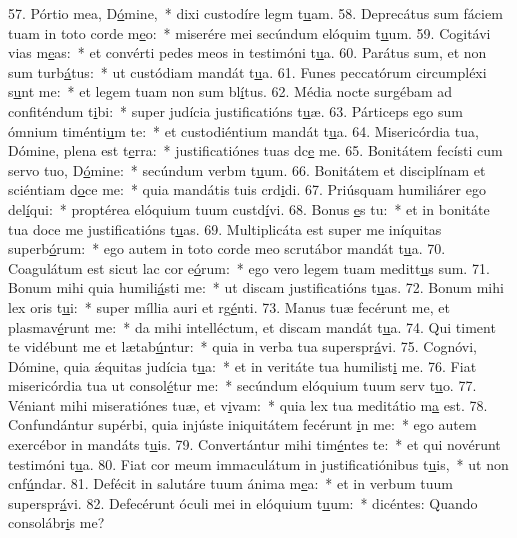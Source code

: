 57. Pórtio mea, D\uline{ó}mine,~* dixi custodíre legm t\uline{u}am.
58. Deprecátus sum fáciem tuam in toto corde m\uline{e}o:~* miserére mei secúndum elóquim t\uline{u}um.
59. Cogitávi vias m\uline{e}as:~* et convérti pedes meos in testimóni t\uline{u}a.
60. Parátus sum, et non sum turb\uline{á}tus:~* ut custódiam mandát t\uline{u}a.
61. Funes peccatórum circumpléxi s\uline{u}nt me:~* et legem tuam non sum bl\uline{í}tus.
62. Média nocte surgébam ad confiténdum t\uline{i}bi:~* super judícia justificatións t\uline{u}æ.
63. Párticeps ego sum ómnium timénti\uline{u}m te:~* et custodiéntium mandát t\uline{u}a.
64. Misericórdia tua, Dómine, plena est t\uline{e}rra:~* justificatiónes tuas dc\uline{e} me.
65. Bonitátem fecísti cum servo tuo, D\uline{ó}mine:~* secúndum verbm t\uline{u}um.
66. Bonitátem et disciplínam et sciéntiam d\uline{o}ce me:~* quia mandátis tuis crd\uline{i}di.
67. Priúsquam humiliárer ego del\uline{í}qui:~* proptérea elóquium tuum custd\uline{í}vi.
68. Bonus \uline{e}s tu:~* et in bonitáte tua doce me justificatións t\uline{u}as.
69. Multiplicáta est super me iníquitas superb\uline{ó}rum:~* ego autem in toto corde meo scrutábor mandát t\uline{u}a.
70. Coagulátum est sicut lac cor e\uline{ó}rum:~* ego vero legem tuam meditt\uline{u}s sum.
71. Bonum mihi quia humili\uline{á}sti me:~* ut discam justificatións t\uline{u}as.
72. Bonum mihi lex oris t\uline{u}i:~* super míllia auri et rg\uline{é}nti.
73. Manus tuæ fecérunt me, et plasmav\uline{é}runt me:~* da mihi intelléctum, et discam mandát t\uline{u}a.
74. Qui timent te vidébunt me et lætab\uline{ú}ntur:~* quia in verba tua superspr\uline{á}vi.
75. Cognóvi, Dómine, quia ǽquitas judícia t\uline{u}a:~* et in veritáte tua humilist\uline{i} me.
76. Fiat misericórdia tua ut consol\uline{é}tur me:~* secúndum elóquium tuum serv t\uline{u}o.
77. Véniant mihi miseratiónes tuæ, et v\uline{i}vam:~* quia lex tua meditátio m\uline{a} est.
78. Confundántur supérbi, quia injúste iniquitátem fecérunt \uline{i}n me:~* ego autem exercébor in mandáts t\uline{u}is.
79. Convertántur mihi tim\uline{é}ntes te:~* et qui novérunt testimóni t\uline{u}a.
80. Fiat cor meum immaculátum in justificatiónibus t\uline{u}is,~* ut non cnf\uline{ú}ndar.
81. Defécit in salutáre tuum ánima m\uline{e}a:~* et in verbum tuum superspr\uline{á}vi.
82. Defecérunt óculi mei in elóquium t\uline{u}um:~* dicéntes: Quando consolábr\uline{i}s me?
